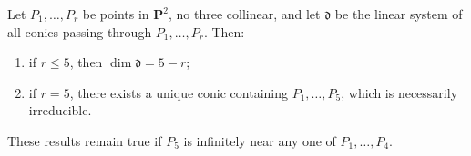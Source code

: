 Let $P_1, \ldots, P_r$ be points in $\mathbf{P}^2$, no three collinear, and let $\mathfrak{d}$ be the linear system of all conics passing through $P_1, \ldots, P_r$. Then:
\begin{enumerate}
\item[(a)] if $r \leqslant 5$, then $\dim \mathfrak{d} = 5 - r$;
\item[(b)] if $r = 5$, there exists a unique conic containing $P_1, \ldots, P_5$, which is necessarily irreducible.
\end{enumerate}
These results remain true if $P_5$ is infinitely near any one of $P_1, \ldots, P_4$.
